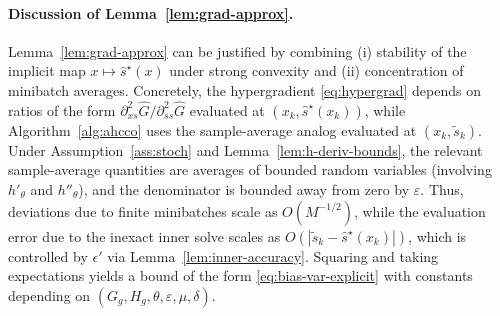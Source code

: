\documentclass{uai2026} %
\theoremstyle{plain}
\theoremstyle{definition}
\begin{document}
\paragraph{Discussion of Lemma~\ref{lem:grad-approx}.}
Lemma~\ref{lem:grad-approx} can be justified by combining (i) stability of the implicit map $x\mapsto \widehat s^\star(x)$ under strong convexity and (ii) concentration of minibatch averages.
Concretely, the hypergradient \eqref{eq:hypergrad} depends on ratios of the form
$
\partial^2_{xs}\widehat G/\partial^2_{ss}\widehat G
$
evaluated at $(x_k,\widehat s^\star(x_k))$, while Algorithm~\ref{alg:ahcco} uses the sample-average analog evaluated at $(x_k,\tilde s_k)$.
Under Assumption~\ref{ass:stoch} and Lemma~\ref{lem:h-deriv-bounds}, the relevant sample-average quantities are averages of bounded random variables (involving $h'_\theta$ and $h''_\theta$), and the denominator is bounded away from zero by $\varepsilon$.
Thus, deviations due to finite minibatches scale as $O(M^{-1/2})$, while the evaluation error due to the inexact inner solve scales as $O(|\tilde s_k-\widehat s^\star(x_k)|)$, which is controlled by $\epsilon'$ via Lemma~\ref{lem:inner-accuracy}.
Squaring and taking expectations yields a bound of the form \eqref{eq:bias-var-explicit} with constants depending on $(G_g,H_g,\theta,\varepsilon,\mu,\delta)$.
\end{document}
